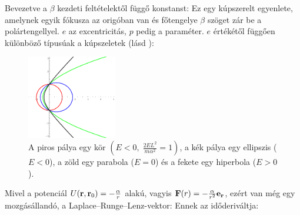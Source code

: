    Bevezetve a $\beta$ kezdeti feltételektől függő konstanst:
   Ez egy kúpszerelt egyenlete, amelynek egyik fókusza az origóban van és főtengelye $\beta$ szöget zár be a polártengellyel. $e$ az excentricitás, $p$ pedig a paraméter. $e$ értékétől függően különböző típusúak a kúpszeletek (lásd ):
   \begin{figure}[ht!]
    \centering
    \includegraphics[width=0.35\textwidth]{A13tetel/palyak1}
    \caption{A piros pálya egy kör $\left(E<0,\;\frac{2EL^2}{m\alpha^2}=1\right)$, a kék pálya egy ellipszis ($E<0$), a zöld egy parabola ($E=0$) és a fekete egy hiperbola ($E>0$). }\label{fig:A13-palyak}
   \end{figure}

   
   Mivel a potenciál $U(\mathbf{r},\mathbf{r}_0)=-\frac{\alpha}{r}$ alakú, vagyis $\mathbf{F}(r)=-\frac{\alpha}{r^2}\mathbf{e}_{\mathbf{r}}$, ezért van még egy mozgásállandó, a Laplace--Runge--Lenz-vektor:
   Ennek az időderiváltja:
   
